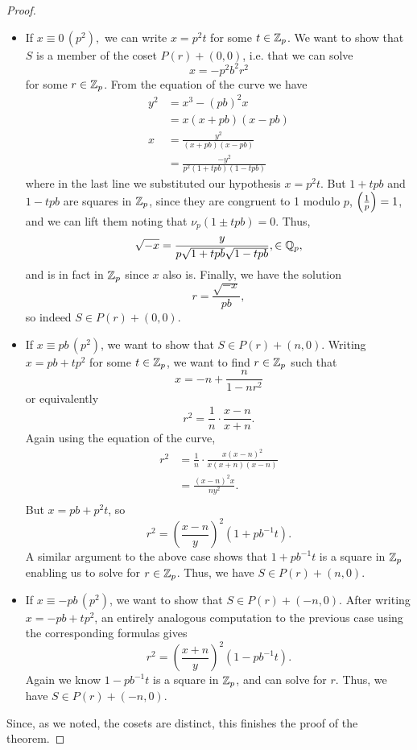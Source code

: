 \documentclass[12pt, a4paper]{report}
\begin{document}
\begin{proof}
  \begin{itemize}
    \item If $x \equiv 0 \, (p^2),$ we can write $x = p^2t$ for some $t \in
      {\mathbb Z}_p$. We want to show that $S$ is a member of the coset $P(r) + (0,0)$,
      i.e. that we can solve
      \[x = -p^2b^2r^2\]
      for some $r \in {\mathbb Z}_p$.
      From the equation of the curve we have
      \begin{equation*}
        \begin{split}
          y^2 &= x^3 - (pb)^2x \\
          &= x(x+pb)(x-pb) \\
          x &= \frac{y^2}{(x+pb)(x-pb)} \\
          &= \frac{-y^2}{p^2(1+tpb)(1-tpb)}
        \end{split}
      \end{equation*}
      where in the last line we substituted our hypothesis $x = p^2t.$ But
      $1 + tpb$ and $1-tpb$ are squares in ${\mathbb Z}_p$, since they are congruent to
      1 modulo $p$, $\left(\frac{1}{p}\right) = 1$, and we can lift them noting that
      $\nu_p(1 \pm tpb) = 0$. Thus, 
      \[\sqrt{-x} = \frac{y}{p \sqrt{1+tpb} \sqrt{1-tpb}}, \in {\mathbb Q}_p,\]
      and is in fact in ${\mathbb Z}_p$ since $x$ also is. Finally, we have the solution
      \[r = \frac{\sqrt{-x}}{pb},\]
      so indeed $S \in P(r) + (0,0).$


    \item If $x \equiv pb \, (p^2)$, we want to show that $S \in P(r) + (n,0)$.
      Writing $x = pb + tp^2$ for some $t \in {\mathbb Z}_p$, we want to find $r \in
      {\mathbb Z}_p$ such that
      \[x = -n + \frac{n}{1-nr^2} \]
      or equivalently
      \[r^2 = \frac{1}{n} \cdot \frac{x-n}{x+n}. \]
      Again using the equation of the curve,
      \[ \begin{split} r^2 &= \frac{1}{n} \cdot \frac{x (x-n)^2}{x
            (x+n)(x-n)} \\
          &= \frac{(x-n)^2x}{n y^2}. \\
        \end{split}\]
      But $x = pb + p^2t$, so
      \[ r^2 = \left(\frac{x-n}{y}\right)^2 (1+pb^{-1}t).\]
      A similar argument to the above case shows that $1+pb^{-1}t$ is
      a square in ${\mathbb Z}_p$ enabling us to solve for $r \in {\mathbb Z}_p$.
      Thus, we have $S \in P(r) + (n,0)$.

    \item If $x \equiv -pb \, (p^2)$, we want to show that $S \in P(r) +
      (-n,0)$. After writing $x = -pb + tp^2$, an entirely analogous computation
      to the previous case using the corresponding formulas gives
      \[r^2 = \left( \frac{x+n}{y} \right)^2 (1 - pb^{-1}t).\]
      Again we know $1-pb^{-1}t$ is a square in ${\mathbb Z}_p$, and can solve for
      $r$. Thus, we have $S \in P(r) + (-n,0)$.
  \end{itemize}

  Since, as we noted, the cosets are distinct, this finishes the proof of the theorem.
\end{proof}
\end{document}
